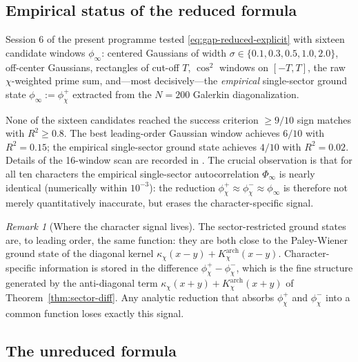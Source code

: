 \documentclass[a4paper,10pt,twocolumn]{article}
\theoremstyle{definition}
\theoremstyle{remark}
\newtheorem{remark}[theorem]{Remark}
\newcommand{\chifn}{\chi}
\begin{document}
\subsection{Empirical status of the reduced formula}
\label{sec:formula-reduced-empirical}

Session 6 of the present programme tested \eqref{eq:gap-reduced-explicit}
with sixteen candidate windows $\phi_\infty$: centered Gaussians of
width $\sigma\in\{0.1,0.3,0.5,1.0,2.0\}$, off-center Gaussians, rectangles
of cut-off $T$, $\cos^2$ windows on $[-T,T]$, the raw
$\chifn$-weighted prime sum, and---most decisively---the \emph{empirical}
single-sector ground state
$\phi_\infty:=\phi_{\chifn}^+$ extracted from the $N=200$ Galerkin
diagonalization.

None of the sixteen candidates reached the success criterion
$\geq\!9/10$ sign matches with $R^2\geq 0.8$. The best
leading-order Gaussian window achieves $6/10$ with $R^2=0.15$; the
empirical single-sector ground state achieves $4/10$ with
$R^2=0.02$. Details of the 16-window scan are recorded in
\cite{Woche4Validation}. The crucial observation is that for all
ten characters the empirical single-sector autocorrelation
$\Phi_\infty$ is nearly identical (numerically within $10^{-3}$):
the reduction $\phi_{\chifn}^+\approx\phi_{\chifn}^-\approx
\phi_\infty$ is therefore not merely quantitatively inaccurate, but
erases the character-specific signal.

\begin{remark}[Where the character signal lives]
\label{rem:signal-locus}
The sector-restricted ground states are, to leading order, the same
function: they are both close to the Paley-Wiener ground state of
the diagonal kernel $\kappa_{\chifn}(x-y)+K^{\mathrm{arch}}_{\chifn}
(x-y)$. Character-specific information is stored in the difference
$\phi_{\chifn}^+-\phi_{\chifn}^-$, which is the fine structure
generated by the anti-diagonal term $\kappa_{\chifn}(x+y)+
K^{\mathrm{arch}}_{\chifn}(x+y)$ of Theorem~\ref{thm:sector-diff}.
Any analytic reduction that absorbs $\phi_{\chifn}^+$ and
$\phi_{\chifn}^-$ into a common function loses exactly this signal.
\end{remark}

\subsection{The unreduced formula}
\label{sec:formula-unreduced}
\end{document}
